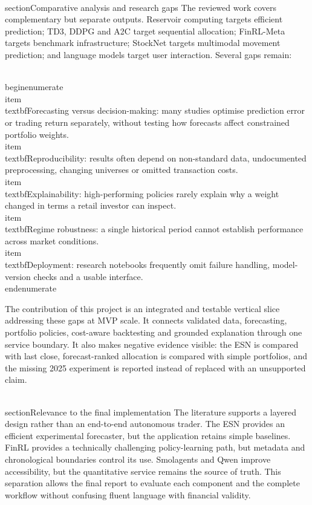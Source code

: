 \\section{Comparative analysis and research gaps}
The reviewed work covers complementary but separate outputs. Reservoir computing targets efficient prediction; TD3, DDPG and A2C target sequential allocation; FinRL-Meta targets benchmark infrastructure; StockNet targets multimodal movement prediction; and language models target user interaction. Several gaps remain:

\\begin{enumerate}
\\item \\textbf{Forecasting versus decision-making:} many studies optimise prediction error or trading return separately, without testing how forecasts affect constrained portfolio weights.
\\item \\textbf{Reproducibility:} results often depend on non-standard data, undocumented preprocessing, changing universes or omitted transaction costs.
\\item \\textbf{Explainability:} high-performing policies rarely explain why a weight changed in terms a retail investor can inspect.
\\item \\textbf{Regime robustness:} a single historical period cannot establish performance across market conditions.
\\item \\textbf{Deployment:} research notebooks frequently omit failure handling, model-version checks and a usable interface.
\\end{enumerate}

The contribution of this project is an integrated and testable vertical slice addressing these gaps at MVP scale. It connects validated data, forecasting, portfolio policies, cost-aware backtesting and grounded explanation through one service boundary. It also makes negative evidence visible: the ESN is compared with last close, forecast-ranked allocation is compared with simple portfolios, and the missing 2025 experiment is reported instead of replaced with an unsupported claim.

\\section{Relevance to the final implementation}
The literature supports a layered design rather than an end-to-end autonomous trader. The ESN provides an efficient experimental forecaster, but the application retains simple baselines. FinRL provides a technically challenging policy-learning path, but metadata and chronological boundaries control its use. Smolagents and Qwen improve accessibility, but the quantitative service remains the source of truth. This separation allows the final report to evaluate each component and the complete workflow without confusing fluent language with financial validity.
